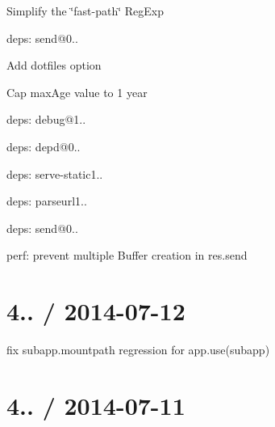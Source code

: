 {\begin{DoxyItemize}
\begin{DoxyItemize}
\item Simplify the \char`\"{}fast-\/path\char`\"{} {\ttfamily Reg\+Exp}
\end{DoxyItemize}
\item deps\+: send@0..
\begin{DoxyItemize}
\item Add {\ttfamily dotfiles} option
\item Cap {\ttfamily max\+Age} value to 1 year
\item deps\+: debug@1..
\item deps\+: depd@0..
\end{DoxyItemize}
\item deps\+: serve-\/static1..
\begin{DoxyItemize}
\item deps\+: parseurl1..
\item deps\+: send@0..
\end{DoxyItemize}
\item perf\+: prevent multiple {\ttfamily Buffer} creation in {\ttfamily res.\+send}
\end{DoxyItemize}}

{\ttfamily \section*{4.. / 2014-\/07-\/12 }}

{\ttfamily }

{\ttfamily 
\begin{DoxyItemize}
\item fix {\ttfamily subapp.\+mountpath} regression for {\ttfamily app.\+use(subapp)}
\end{DoxyItemize}}

{\ttfamily \section*{4.. / 2014-\/07-\/11 }}

{\ttfamily }

